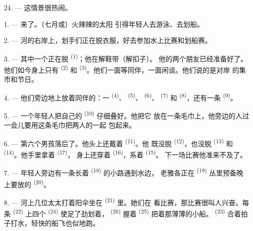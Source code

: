 24. --- 这情景很热闹。
\VUsaut{4.0mm}

\VUsaut{3.0mm}

\VUsaut{2.4mm}

\VUsaut{3.0mm}

1. --- 来了。（七月或）火辣辣的太阳
引得年轻人去游泳、去划船。

2. --- 河的右岸上，划手们正在脱衣服，好去参加水上比赛和划船赛。

3. --- 其中一个正在脱 \textsuperscript{(1)}；他在解鞋带（解扣子）。
他的两个朋友已经准备好了。他们如今身上只有 \textsuperscript{(2)}
和 \textsuperscript{(3)}。他们一面等同伴，一面闲谈。他们说的是对岸
的集市和节日。

4. --- 他们旁边地上放着同伴的：一
\textsuperscript{(4)}、 \textsuperscript{(5)}、
\textsuperscript{(6)}、 \textsuperscript{(7)} 和
\textsuperscript{(8)}，还有一条 \textsuperscript{(9)}。

5. --- 一个年轻人把自己的 \textsuperscript{(10)} 仔细叠好。他把它
放在一条毛巾上，他旁边的人过一会儿要用这条毛巾把两人的一起
包起来。

6. --- 第六个男孩落后了。他头上还戴着 \textsuperscript{(11)}。他
既没脱 \textsuperscript{(12)}，也没脱 \textsuperscript{(13)}
和 \textsuperscript{(14)}。他手里拿着 \textsuperscript{(17)}，
身上还穿着 \textsuperscript{(16)}，系着 \textsuperscript{(15)}。
下一场比赛他准来不及了。

7. --- 年轻人旁边有一条长着 \textsuperscript{(18)} 的小路通到水边，
老雅各正在 \textsuperscript{(19)} 丛里预备晚上要放的
\textsuperscript{(20)}。

\VUsaut{4.4mm}
\VUsaut{3.4mm}

8. --- 河上几位太太打着阳伞坐在 \textsuperscript{(21)} 里。她们在
看比赛，那比赛很叫人兴奋。每条 \textsuperscript{(22)} 上四个
 \textsuperscript{(24)} 使足了劲划着， \textsuperscript{(26)}
握着 \textsuperscript{(25)} 把着那薄薄的小船。
\textsuperscript{(23)} 合着拍子打水，轻快的船飞也似地跑。

